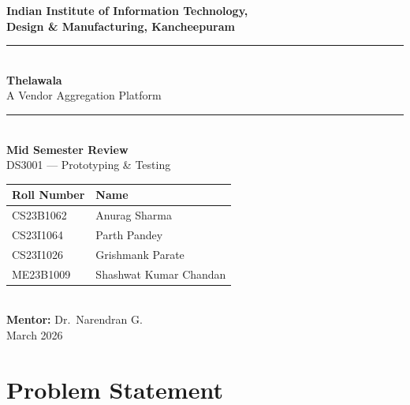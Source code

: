 \documentclass[12pt, a4paper]{article}
\begin{document}
\begin{titlepage}
    \centering
    \vspace*{1cm}

    {\large\bfseries Indian Institute of Information Technology,}\\[0.15cm]
    {\large\bfseries Design \& Manufacturing, Kancheepuram}\\[1.2cm]

    \rule{\linewidth}{0.4pt}\\[0.6cm]

    {\Huge\bfseries Thelawala}\\[0.4cm]
    {\LARGE A Vendor Aggregation Platform}\\[0.6cm]

    \rule{\linewidth}{0.4pt}\\[1.2cm]

    {\large\textbf{Mid Semester Review}}\\[0.3cm]
    {\large DS3001 --- Prototyping \& Testing}\\[2cm]

    \begin{tabular}{l l}
        \toprule
        \textbf{Roll Number} & \textbf{Name} \\
        \midrule
        CS23B1062  & Anurag Sharma \\
        CS23I1064  & Parth Pandey \\
        CS23I1026  & Grishmank Parate \\
        ME23B1009  & Shashwat Kumar Chandan \\
        \bottomrule
    \end{tabular}\\[1.5cm]

    {\large \textbf{Mentor:} Dr.\ Narendran G.}\\[1cm]

    {\large March 2026}

    \vfill
\end{titlepage}

\hypersetup{pageanchor=true}
\tableofcontents
\newpage

\section{Problem Statement}
\end{document}
